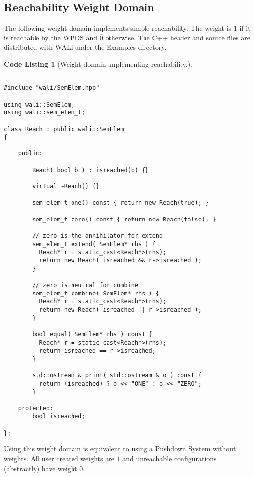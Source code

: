 \documentclass[english,a4paper,11pt]{article}
\theoremstyle{definition}
\newtheorem{codelist}{Code Listing}[section]
\def\ONE{\bar{1}}
\def\ZERO{\bar{0}}
\begin{document}
\subsection{Reachability Weight Domain}
The following weight domain implements simple reachability. The weight is
$\ONE$ if it is reachable by the WPDS and $\ZERO$ otherwise. The C++ header
\lstset{language=[GNU]C++,basicstyle=\ttfamily\small}
and source files are distributed with WALi under the Examples directory.
\begin{codelist}[Weight domain implementing reachability.]
\label{Reach}
\begin{lstlisting}

#include "wali/SemElem.hpp"

using wali::SemElem;
using wali::sem_elem_t;

class Reach : public wali::SemElem
{

    public:

        Reach( bool b ) : isreached(b) {}

        virtual ~Reach() {}

        sem_elem_t one() const { return new Reach(true); }

        sem_elem_t zero() const { return new Reach(false); }

        // zero is the annihilator for extend
        sem_elem_t extend( SemElem* rhs ) {
          Reach* r = static_cast<Reach*>(rhs);
          return new Reach( isreached && r->isreached );
        }
        
        // zero is neutral for combine
        sem_elem_t combine( SemElem* rhs ) {
          Reach* r = static_cast<Reach*>(rhs);
          return new Reach( isreached || r->isreached );
        }
        
        bool equal( SemElem* rhs ) const {
          Reach* r = static_cast<Reach*>(rhs);
          return isreached == r->isreached;
        }

        std::ostream & print( std::ostream & o ) const {
          return (isreached) ? o << "ONE" : o << "ZERO";
        }

    protected:
        bool isreached;

};
\end{lstlisting}
\end{codelist}

Using this weight domain is equivalent to using a Pushdown System without
weights. All user created weights are $\ONE$ and unreachable configurations
(abstractly) have weight $\ZERO$.
\end{document}

